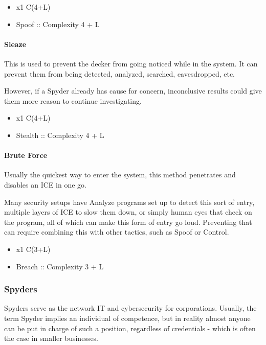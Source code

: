\begin{multicols*}{3}
	\begin{itemize}
		\itemsep 0pt
		\item x1 C(4+L)
		\item Spoof :: Complexity 4 + L
	\end{itemize}
	
	\paragraph{Sleaze}
	
	This is used to prevent the decker from going noticed while in the system. It can prevent them from being detected, analyzed, searched, eavesdropped, etc. 
	
	However, if a Spyder already has cause for concern, inconclusive results could give them more reason to continue investigating.
	
	\begin{itemize}
		\itemsep 0pt
		\item x1 C(4+L)
		\item Stealth :: Complexity 4 + L
	\end{itemize}
	
	\paragraph{Brute Force}
	
	Usually the quickest way to enter the system, this method penetrates and disables an ICE in one go. 
	
	Many security setups have Analyze programs set up to detect this sort of entry, multiple layers of ICE to slow them down, or simply human eyes that check on the program, all of which can make this form of entry go loud. Preventing that can require combining this with other tactics, such as Spoof or Control.
	
	\begin{itemize}
		\itemsep 0pt
		\item x1 C(3+L)
		\item Breach :: Complexity 3 + L
	\end{itemize}
	
	
	\subsubsection{Spyders}
	
	Spyders serve as the network IT and cybersecurity for corporations. Usually, the term Spyder implies an  individual of competence, but in reality almost anyone can be put in charge of such a position, regardless of credentials - which is often the case in smaller businesses.
	

\end{multicols*}
